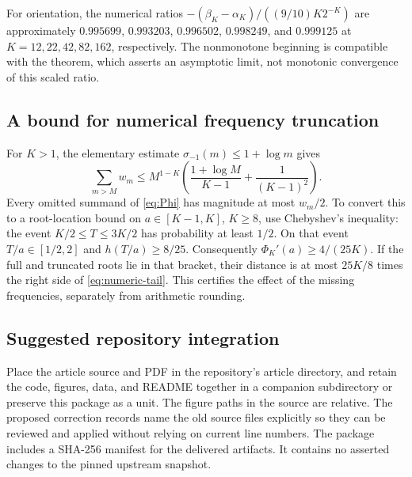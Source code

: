 \documentclass[11pt]{article}
\numberwithin{equation}{section}
\theoremstyle{definition}
\theoremstyle{remark}
\begin{document}
For orientation, the numerical ratios
$-(\beta_K-\alpha_K)/((9/10)K2^{-K})$ are approximately
$0.995699$, $0.993203$, $0.996502$, $0.998249$, and $0.999125$
at $K=12,22,42,82,162$, respectively. The nonmonotone beginning
is compatible with the theorem, which asserts an asymptotic limit,
not monotonic convergence of this scaled ratio.

\subsection{A bound for numerical frequency truncation}

For $K>1$, the elementary estimate
$\sigma_{-1}(m)\le1+\log m$ gives
\begin{equation}\label{eq:numeric-tail}
 \sum_{m>M}w_m
 \le M^{1-K}\left(\frac{1+\log M}{K-1}
                         +\frac1{(K-1)^2}\right).
\end{equation}
Every omitted summand of \eqref{eq:Phi} has magnitude at most
$w_m/2$. To convert this to a root-location bound on
$a\in[K-1,K]$, $K\ge8$, use Chebyshev's inequality:
the event $K/2\le T\le3K/2$ has probability at least $1/2$.
On that event $T/a\in[1/2,2]$ and $h(T/a)\ge8/25$.
Consequently
$\Phi_K'(a)\ge4/(25K)$. If the full and truncated roots lie in
that bracket, their distance is at most $25K/8$ times the right
side of \eqref{eq:numeric-tail}. This certifies the effect of
the missing frequencies, separately from arithmetic rounding.

\subsection{Suggested repository integration}

Place the article source and PDF in the repository's article
directory, and retain the code, figures, data, and README together
in a companion subdirectory or preserve this package as a unit.
The figure paths in the source are relative. The proposed
correction records name the old source files explicitly so they
can be reviewed and applied without relying on current line numbers.
The package includes a SHA-256 manifest for the delivered artifacts.
It contains no asserted changes to the pinned upstream snapshot.
\end{document}
